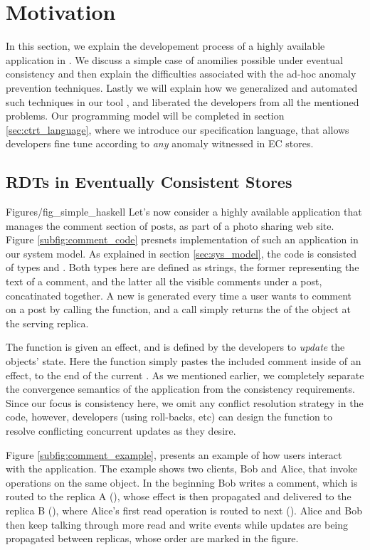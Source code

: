 \newpage
\section{Motivation}
\label {sec:motiv}
In this section, we explain the developement process of a highly
available application in \tool. We discuss a simple case of anomilies
possible under
eventual consistency and then explain the difficulties associated 
with the ad-hoc anomaly prevention techniques.
Lastly we will explain how we generalized and automated such techniques
in our tool \tool, and liberated 
the developers from all the mentioned problems.
Our programming model will be completed in section
\ref{sec:ctrt_language}, where we introduce our specification  language,
that
allows developers fine tune \tool according to \emph{any} 
anomaly witnessed in EC stores.
%
%
\subsection{RDTs in Eventually Consistent Stores }
 {Figures/fig_simple_haskell}
Let's now consider a highly available application that manages the comment
section of posts, as part of a photo sharing web site.
Figure \ref{subfig:comment_code} presnets implementation of such an application
in our system model. As explained in section \ref{sec:sys_model}, the
code is consisted of types \effectC{} and \stateC{}. Both types here are
defined as strings, the former representing the text of a comment, and
the latter all the visible comments under a post, concatinated together.
A new \effectC{} is generated every time a user wants to comment on a
post by calling the \writeC{} function, and a \readC{} call simply
returns the \stateC{} of the object at the serving replica.

The \applyC{} function is given an effect, and is defined by the
developers to \emph{update} the objects' state.
Here the \applyC{} function simply pastes the 
included comment inside of  an effect, to the end of the current \stateC{}. As we mentioned earlier, we
completely separate the convergence semantics of the application  from the consistency
requirements. Since our focus is consistency here, we omit any conflict
resolution strategy in the code, however, developers (using roll-backs,
etc) can design the \applyC{} function to resolve conflicting
concurrent updates as they desire. 

Figure \ref{subfig:comment_example}, presents an example of how users
interact with the application. The example shows two clients, Bob and
Alice, that invoke operations on the same object. In the
beginning Bob writes a comment, which is routed to the replica A
(),
whose effect is then propagated and delivered to the replica B
(), where Alice's
first read operation is routed to next (). Alice and Bob then keep talking
through more read and write events while updates are being propagated between
replicas, whose order are marked in the
figure. 

